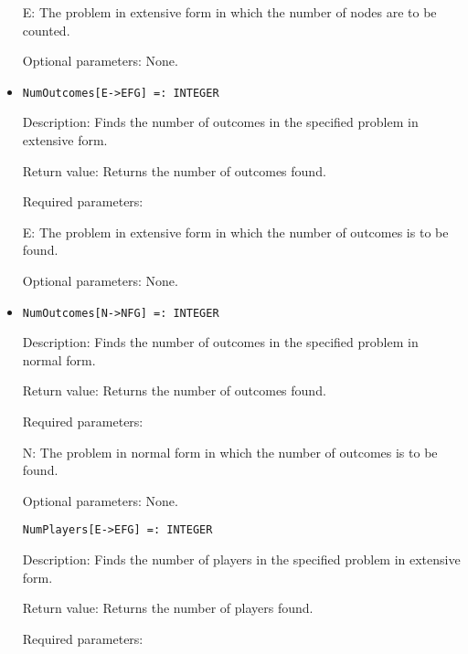 \begin{itemize}
\bd
\item
[E:] The problem in extensive form in which the number of nodes are to
be counted.
\ed

\item
[Optional parameters:] None.
\ed

\item
\protect \large \begin{verbatim}
NumOutcomes[E->EFG] =: INTEGER
\end{verbatim}

\normalsize

\bd
\item
[Description:] Finds the number of outcomes in the specified problem
in extensive form.
\item
[Return value:] Returns the number of outcomes found.
\item
[Required parameters:] \hfil\null

\bd
\item
[E:] The problem in extensive form in which the number of outcomes is
to be found.
\ed

\item
[Optional parameters:] None.
\ed

\item
\protect \large \begin{verbatim}
NumOutcomes[N->NFG] =: INTEGER
\end{verbatim}\normalsize

\bd
\item
[Description:] Finds the number of outcomes in the specified problem
in normal form.
\item
[Return value:] Returns the number of outcomes found.
\item
[Required parameters:]\hfil\null
	
\bd
\item
[N:] The problem in normal form in which the number of outcomes is to
be found.
\ed

\item
[Optional parameters:] None.
\ed

\protect \large \begin{verbatim}
NumPlayers[E->EFG] =: INTEGER
\end{verbatim}
\normalsize

\bd
\item
[Description:] Finds the number of players in the specified problem in
extensive form.
\item
[Return value:] Returns the number of players found.
\item
[Required parameters:]\hfil\null


\end{itemize}
